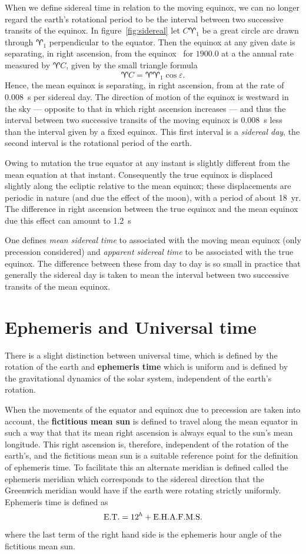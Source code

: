 When we define sidereal time in relation to the moving equinox, we can no longer 
regard the earth's rotational period to be the interval between two successive transits
of the equinox. In figure~\ref{fig:sidereal} let $C\aries_1$ be a great circle arc
drawn through $\aries_1$ perpendicular to the equator. Then the equinox at any given 
date is separating, in right ascension, from the equinox \aries\  for $1900.0$ at a the
annual rate measured by $\aries C$, given by the small triangle formula
\[ 
\aries C=\aries\aries_1\cos\varepsilon.
\]
Hence, the mean equinox is separating, in right ascension, from \aries at the rate
of $0.008$~s per sidereal day. The direction of motion of the equinox is westward 
in the sky --- opposite to that in which right ascension increases --- and thus the 
interval between two successive transits of the moving equinox is $0.008$~s less than 
the interval given by a fixed equinox. This first interval is a {\it sidereal day}, 
the second interval is the rotational period of the earth.

Owing to nutation the true equator at any instant is slightly different from the 
mean equation at that instant. Consequently the true equinox is displaced slightly 
along the ecliptic relative to the mean equinox; these displacements are periodic
in nature (and due the effect of the moon), with a period of about 18~yr. 
The difference in right ascension between the true equinox and the mean equinox due 
this effect can amount to 1.2~s

One defines {\it mean sidereal time} to associated with the moving mean equinox 
(only precession considered) and {\it apparent sidereal time} to be associated 
with the true equinox. The difference between these from day to day is so small
in practice that generally the sidereal day is taken to mean the interval between
two successive transits of the mean equinox.

\section{Ephemeris and Universal time}

There is a slight distinction between universal time, which is defined by the 
rotation of the earth and {\bf ephemeris time} which is uniform and is defined
by the gravitational dynamics of the solar system, independent of the earth's 
rotation.

When the movements of the equator and equinox due to precession are taken into
account, the {\bf fictitious mean sun} is defined to travel along the mean 
equator in such a way that that its mean right ascension is always equal to 
the sun's mean longitude. This right ascension is, therefore, independent 
of the rotation of the earth's, and the fictitious mean sun is a 
suitable reference point for the definition of ephemeris time. To 
facilitate this an alternate meridian is defined called the ephemeris 
meridian which corresponds to the sidereal direction that the
Greenwich meridian would have if the earth were rotating strictly uniformly. 
Ephemeris time is defined as 
\[
{\rm E.T.}=12^h+{\rm E.H.A.F.M.S.}
\]
where the last term of the right hand side is the ephemeris hour angle of the 
fictitious mean sun. 

